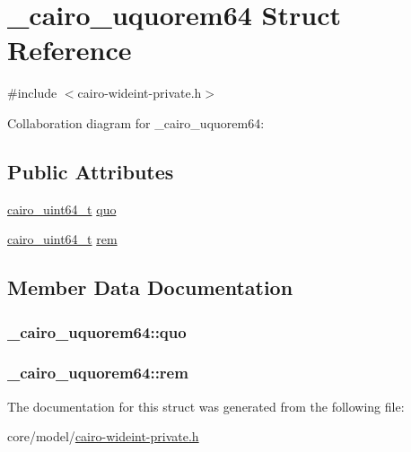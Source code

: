 \hypertarget{struct__cairo__uquorem64}{}\section{\+\_\+cairo\+\_\+uquorem64 Struct Reference}
\label{struct__cairo__uquorem64}


{\ttfamily \#include $<$cairo-\/wideint-\/private.\+h$>$}



Collaboration diagram for \+\_\+cairo\+\_\+uquorem64\+:
\subsection*{Public Attributes}
\begin{DoxyCompactItemize}
\item 
\hyperlink{cairo-wideint-private_8h_addac97960d28a0f1b58a5abefd21b14b}{cairo\+\_\+uint64\+\_\+t} \hyperlink{struct__cairo__uquorem64_aa1ba1d4582ee46d1769ff01d63242ac8}{quo}
\item 
\hyperlink{cairo-wideint-private_8h_addac97960d28a0f1b58a5abefd21b14b}{cairo\+\_\+uint64\+\_\+t} \hyperlink{struct__cairo__uquorem64_af360df0b81f94d6ac85f4cec13bb7431}{rem}
\end{DoxyCompactItemize}


\subsection{Member Data Documentation}
\subsubsection[{\texorpdfstring{quo}{quo}}]{ \+\_\+cairo\+\_\+uquorem64\+::quo}\hypertarget{struct__cairo__uquorem64_aa1ba1d4582ee46d1769ff01d63242ac8}{}\label{struct__cairo__uquorem64_aa1ba1d4582ee46d1769ff01d63242ac8}
\subsubsection[{\texorpdfstring{rem}{rem}}]{ \+\_\+cairo\+\_\+uquorem64\+::rem}\hypertarget{struct__cairo__uquorem64_af360df0b81f94d6ac85f4cec13bb7431}{}\label{struct__cairo__uquorem64_af360df0b81f94d6ac85f4cec13bb7431}


The documentation for this struct was generated from the following file\+:\begin{DoxyCompactItemize}
\item 
core/model/\hyperlink{cairo-wideint-private_8h}{cairo-\/wideint-\/private.\+h}\end{DoxyCompactItemize}
